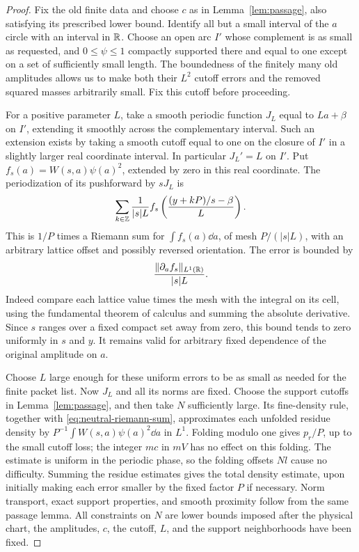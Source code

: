 \begin{proof}
Fix the old finite data and choose $c$ as in Lemma~\ref{lem:passage},
also satisfying its prescribed lower bound. Identify all but a
small interval of the $a$ circle with an interval in $\mathbb R$.
Choose an open arc $I'$ whose complement is as small as requested,
and $0\le\psi\le1$ compactly supported there and equal to one
except on a set of sufficiently small length. The boundedness of
the finitely many old amplitudes allows us to make both their
$L^2$ cutoff errors and the removed squared masses arbitrarily
small. Fix this cutoff before proceeding.

For a positive parameter $L$, take a smooth periodic function
$J_L$ equal to $La+\beta$ on $I'$, extending it smoothly across
the complementary interval. Such an extension exists by taking
a smooth cutoff equal to one on the closure of $I'$ in a slightly
larger real coordinate interval. In particular $J_L'=L$ on $I'$.
Put $f_s(a)=W(s,a)\psi(a)^2$, extended by zero in this real
coordinate. The periodization of its pushforward by $sJ_L$ is
\begin{equation}\label{eq:neutral-riemann-sum}
 \sum_{k\in\mathbb Z}\frac1{|s|L}
 f_s\left(\frac{(y+kP)/s-\beta}{L}\right).
\end{equation}
This is $1/P$ times a Riemann sum for $\int f_s(a)\dd a$, of mesh
$P/(|s|L)$, with an arbitrary lattice offset and possibly reversed
orientation. The error is bounded by
\begin{equation}\label{eq:neutral-riemann-error}
 \frac{\|\partial_a f_s\|_{L^1(\mathbb R)}}{|s|L}.
\end{equation}
Indeed compare each lattice value times the mesh with the integral
on its cell, using the fundamental theorem of calculus and summing
the absolute derivative. Since $s$ ranges over a fixed compact set
away from zero, this bound tends to zero uniformly in $s$ and $y$.
It remains valid for arbitrary fixed dependence of the original
amplitude on $a$.

Choose $L$ large enough for these uniform errors to be as small as
needed for the finite packet list. Now $J_L$ and all its norms are
fixed. Choose the support cutoffs in Lemma~\ref{lem:passage}, and
then take $N$ sufficiently large. Its fine-density rule, together
with \eqref{eq:neutral-riemann-sum}, approximates each unfolded
residue density by $P^{-1}\int W(s,a)\psi(a)^2\dd a$ in $L^1$.
Folding modulo one gives $p_r/P$, up to the small cutoff loss;
the integer $mc$ in $mV$ has no effect on this folding. The
estimate is uniform in the periodic phase, so the folding offsets
$Nl$ cause no difficulty. Summing the residue estimates gives the
total density estimate, upon initially making each error smaller
by the fixed factor $P$ if necessary. Norm transport, exact
support properties, and smooth proximity follow from the same
passage lemma. All constraints on $N$ are lower bounds imposed
after the physical chart, the amplitudes, $c$, the cutoff, $L$,
and the support neighborhoods have been fixed.
\end{proof}

